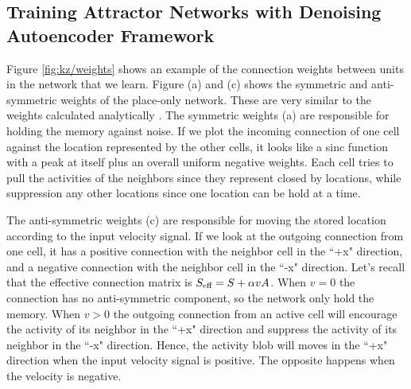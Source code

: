 \subsection{Training Attractor Networks with Denoising Autoencoder Framework}
\label{sec:result_training}

Figure \ref{fig:kz/weights} shows an example of the connection weights between units in the network that we learn. Figure (a) and (c) shows the symmetric and anti-symmetric weights of the place-only network. These are very similar to the weights calculated analytically \cite{zk96}. The symmetric weights (a) are responsible for holding the memory against noise. If we plot the incoming connection of one cell against the location represented by the other cells, it looks like a sinc function with a peak at itself plus an overall uniform negative weights. Each cell tries to pull the activities of the neighbors since they represent closed by locations, while suppression any other locations since one location can be hold at a time.

The anti-symmetric weights (c) are responsible for moving the stored location according to the input velocity signal. If we look at the outgoing connection from one cell, it has a positive connection with the neighbor cell in the ``+x" direction, and a negative connection with the neighbor cell in the ``-x" direction. Let's recall that the effective connection matrix is $S_{\text{\scriptsize{eff}}} = S + \alpha v A$. When $v=0$ the connection has no anti-symmetric component, so the network only hold the memory. When $v>0$ the outgoing connection from an active cell will encourage the activity of its neighbor in the ``+x" direction and suppress the activity of its neighbor in the ``-x" direction. Hence, the activity blob will moves in the ``+x" direction when the input velocity signal is positive. The opposite happens when the velocity is negative.

